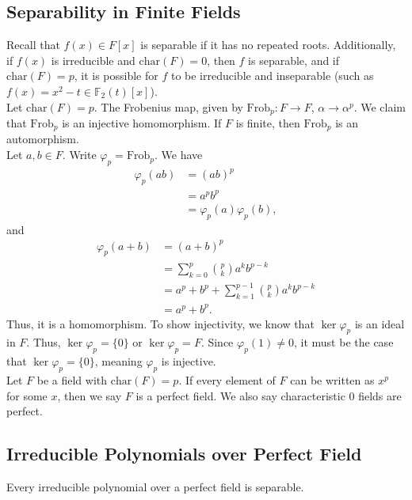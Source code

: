 \documentclass[10pt]{extarticle}
\begin{document}
  \subsection{Separability in Finite Fields}%
  Recall that $f(x) \in F[x]$ is separable if it has no repeated roots. Additionally, if $f(x)$ is irreducible and $\text{char}(F)= 0$, then $f$ is separable, and if $\text{char}(F) = p$, it is possible for $f$ to be irreducible and inseparable (such as $f(x) = x^2 - t\in \mathbb{F}_2(t)[x]$).\\

  Let $\text{char}(F) = p$. The Frobenius map, given by $\text{Frob}_p: F\rightarrow F$, $\alpha \rightarrow \alpha^p$. We claim that $\text{Frob}_p$ is an injective homomorphism. If $F$ is finite, then $\text{Frob}_p$ is an automorphism.\\

  Let $a,b\in F$. Write $\varphi_p = \text{Frob}_p$. We have
  \begin{align*}
    \varphi_p(ab) &= (ab)^p\\
                  &= a^pb^p\\
                  &= \varphi_p(a)\varphi_p(b),
  \end{align*}
  and
  \begin{align*}
    \varphi_p(a+b) &= (a+b)^p\\
                   &= \sum_{k=0}^{p}{p\choose k}a^kb^{p-k}\\
                   &= a^p + b^p + \sum_{k=1}^{p-1}{p\choose k}a^kb^{p-k}\\
                   &= a^p + b^p.
  \end{align*}
  Thus, it is a homomorphism. To show injectivity, we know that $\ker\varphi_p$ is an ideal in $F$. Thus, $\ker\varphi_p = \{0\}$ or $\ker\varphi_p = F$. Since $\varphi_p(1) \neq 0$, it must be the case that $\ker\varphi_p = \{0\}$, meaning $\varphi_p$ is injective.\\

  Let $F$ be a field with $\text{char}(F) = p$. If every element of $F$ can be written as $x^p$ for some $x$, then we say $F$ is a perfect field. We also say characteristic $0$ fields are perfect.
  \subsection{Irreducible Polynomials over Perfect Field}%
  Every irreducible polynomial over a perfect field is separable.\\
\end{document}
